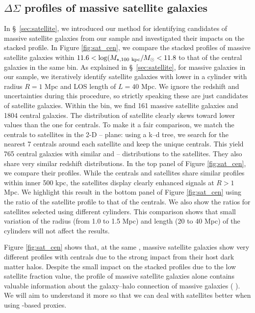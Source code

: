 \documentclass[fleqn,usenatbib,useAMS]{mnras}
\begin{document}
\begin{CJK*}{UTF8}{gbsn}
\section{\texorpdfstring{$\Delta\Sigma$}{DSigma} profiles of massive satellite galaxies}
	\label{app:sat_cen}

    In \S\ \ref{sec:satellite}, we introduced our method for identifying candidates of massive
    satellite galaxies from our sample and investigated their impacts on the stacked \dsigma{}
    profile.
    In Figure \ref{fig:sat_cen}, we compare the stacked \dsigma{} profiles of massive satellite
    galaxies within $11.6 < \log (M_{\star, 100\ \rm kpc}/M_{\odot} < 11.8$ to that of the central 
    galaxies in the same \mstar{} bin.
    As explained in \S\ \ref{sec:satellite}, for massive galaxies in our sample, we iteratively
    identify satellite galaxies with lower  in a cylinder with radius $R=1$ Mpc and LOS
    length of $L=40$ Mpc.
    We ignore the redshift and \mstar{} uncertainties during this procedure, so strictly speaking 
    these are just candidates of satellite galaxies.
    Within the  bin, we find 161 massive satellite galaxies and 1804 central galaxies.
    The  distribution of satellite clearly skews toward lower values than the one
    for centrals.
    To make it a fair comparison, we match the centrals to satellites in the 2-D 
    -- plane: using a k--d tree, we search for the nearest 7 centrals 
    around each satellite and keep the unique centrals.
    This yield 765 central galaxies with similar  and -- 
    distributions to the satellites. 
    They also share very similar redshift distributions.
    In the top panel of Figure \ref{fig:sat_cen}, we compare their \dsigma{} profiles.
    While the centrals and satellites share similar profiles within inner 500 kpc, the satellites 
    display clearly enhanced \dsigma{} signals at $R>1$ Mpc.
    We highlight this result in the bottom panel of Figure \ref{fig:sat_cen} using the ratio 
    of the satellite \dsigma{} profile to that of the centrals. 
    We also show the ratios for satellites selected using different cylinders. 
    This comparison shows that small variation of the radius (from 1.0 to 1.5 Mpc) and length
    (20 to 40 Mpc) of the cylinders will not affect the results.

    Figure \ref{fig:sat_cen} shows that, at the same \mstar{}, massive satellite galaxies show 
    very different \dsigma{} profiles with centrals due to the strong impact from their host 
    dark matter halos.
    Despite the small impact on the stacked \dsigma{} profiles due to the low satellite fraction 
    value, the \dsigma{} profile of massive satellite galaxies alone contains valuable information 
    about the galaxy--halo connection of massive galaxies (\eg{} \citealt{Sifon2015, Li2016,
    Dvornik2020}).
    We will aim to understand it more so that we can deal with satellites better when using 
    \mstar{}-based \mvir{} proxies.


\end{CJK*}
\end{document}
